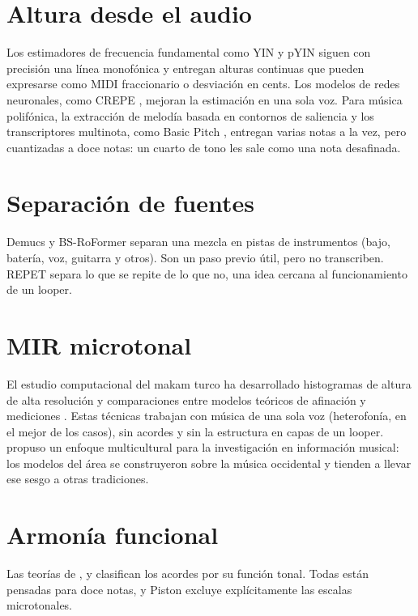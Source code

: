 \section{Altura desde el audio}

Los estimadores de frecuencia fundamental como YIN \citep{decheveigne2002} y pYIN \citep{mauch2014} siguen con precisión
una línea monofónica y entregan alturas continuas que pueden expresarse como MIDI fraccionario o desviación en cents. Los
modelos de redes neuronales, como CREPE \citep{kim2018}, mejoran la estimación en una sola voz. Para música polifónica, la
extracción de melodía basada en contornos de saliencia \citep{salamon2012} y los transcriptores multinota, como Basic Pitch
\citep{bittner2022}, entregan varias notas a la vez, pero cuantizadas a doce notas: un cuarto de tono les sale como una
nota desafinada.

\section{Separación de fuentes}

Demucs \citep{rouard2023} y BS-RoFormer \citep{lu2024} separan una mezcla en pistas de instrumentos (bajo, batería, voz,
guitarra y otros). Son un paso previo útil, pero no transcriben. REPET \citep{rafii2013} separa lo que se repite de lo
que no, una idea cercana al funcionamiento de un looper.

\section{MIR microtonal}

El estudio computacional del makam turco ha desarrollado histogramas de altura de alta resolución y comparaciones entre
modelos teóricos de afinación y mediciones \citep{bozkurt2008,bozkurt2009,gedik2010,bozkurt2014}. Estas técnicas trabajan
con música de una sola voz (heterofonía, en el mejor de los casos), sin acordes y sin la estructura en capas de un
looper. \citet{serra2011} propuso un enfoque multicultural para la investigación en información musical: los modelos
del área se construyeron sobre la música occidental y tienden a llevar ese sesgo a otras tradiciones.

\section{Armonía funcional}

Las teorías de \citet{riemann1893}, \citet{lendvai1971} y \citet{piston1987} clasifican los acordes por su función
tonal. Todas están pensadas para doce notas, y Piston excluye explícitamente las escalas microtonales.

